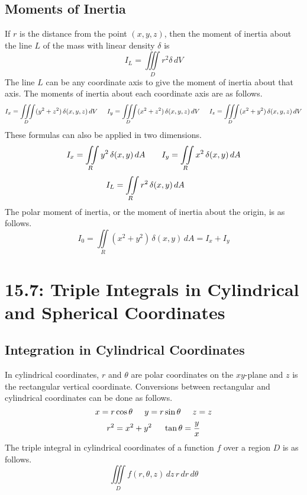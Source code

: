 \documentclass{article}
\begin{document}
\subsection*{Moments of Inertia}
If \(r\) is the distance from the point \((x,y,z)\), then the moment of inertia about the line \(L\) of the mass with linear density \(\delta\) is
\[I_L=\iiint\limits_Dr^2\delta\,dV\]
The line \(L\) can be any coordinate axis to give the moment of inertia about that axis. The moments of inertia about each coordinate axis are as follows.
\[I_x=\iiint\limits_D(y^2+z^2)\,\delta(x,y,z)\,dV\hspace{5 mm}I_y=\iiint\limits_D(x^2+z^2)\,\delta(x,y,z)\,dV\hspace{5 mm}I_z=\iiint\limits_D(x^2+y^2)\,\delta(x,y,z)\,dV\]
These formulas can also be applied in two dimensions.
\[I_x=\iint\limits_Ry^2\,\delta(x,y)\,dA\hspace{7 mm}I_y=\iint\limits_Rx^2\,\delta(x,y)\,dA\]
\[I_L=\iint\limits_Rr^2\,\delta(x,y)\,dA\hspace{7 mm}\]
The polar moment of inertia, or the moment of inertia about the origin, is as follows.
\[I_0=\iint\limits_R(x^2+y^2)\,\delta(x,y)\,dA=I_x+I_y\]
\section*{15.7: Triple Integrals in Cylindrical and Spherical Coordinates}
\subsection*{Integration in Cylindrical Coordinates}
In cylindrical coordinates, \(r\) and \(\theta\) are polar coordinates on the \(xy\)-plane and \(z\) is the rectangular vertical coordinate. Conversions between rectangular and cylindrical coordinates can be done as follows.
\[x=r\cos\theta\hspace{5 mm}y=r\sin\theta\hspace{5 mm}z=z\]
\[r^2=x^2+y^2\hspace{5 mm}\tan\theta=\frac{y}{x}\]
The triple integral in cylindrical coordinates of a function \(f\) over a region \(D\) is as follows.
\[\iiint\limits_Df(r,\theta,z)\,dz\,r\,dr\,d\theta\]
\end{document}
